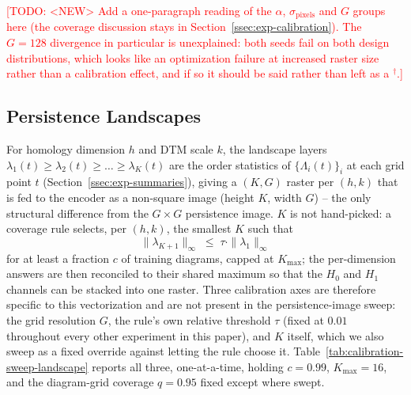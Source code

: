 \documentclass[11pt,letterpaper]{article}
\newcommand{\1}{\mathds{1}}
\newcommand{\todo}[1]{\textcolor{red}{[TODO: #1]}}
\newcommand{\fix}[1]{\textcolor{blue}{[FIX: #1]}}
\newcommand{\todo}[1]{}\newcommand{\fix}[1]{}
\theoremstyle{plain}
\theoremstyle{definitioncolon}
\begin{document}
\todo{<NEW> Add a one-paragraph reading of the $\alpha$, $\sigma_{\text{pixels}}$
and $G$ groups here (the coverage discussion stays in
Section~\ref{ssec:exp-calibration}). The $G=128$ divergence in particular is
unexplained: both seeds fail on both design distributions, which looks like an
optimization failure at increased raster size rather than a calibration effect,
and if so it should be said rather than left as a $^\dagger$.}

\subsection{Persistence Landscapes}
\label{app:calib-landscape}

For homology dimension $h$ and DTM scale $k$, the landscape layers
$\lambda_1(t) \geq \lambda_2(t) \geq \dots \geq \lambda_K(t)$ are the order
statistics of $\{\Lambda_i(t)\}_i$ at each grid point $t$ (Section~\ref{ssec:exp-summaries}),
giving a $(K, G)$ raster per $(h, k)$ that is fed to the encoder as a
non-square image (height $K$, width $G$) -- the only structural difference from
the $G \times G$ persistence image. $K$ is not hand-picked: a coverage rule
selects, per $(h,k)$, the smallest $K$ such that
    \[
    \|\lambda_{K+1}\|_\infty \;\leq\; \tau \cdot \|\lambda_1\|_\infty
    \]
for at least a fraction $c$ of training diagrams, capped at $K_{\max}$; the
per-dimension answers are then reconciled to their shared maximum so that the
$H_0$ and $H_1$ channels can be stacked into one raster. Three calibration axes
are therefore specific to this vectorization and are not present in the
persistence-image sweep: the grid resolution $G$, the rule's own relative
threshold $\tau$ (fixed at $0.01$ throughout every other experiment in this
paper), and $K$ itself, which we also sweep as a fixed override against letting
the rule choose it. Table~\ref{tab:calibration-sweep-landscape} reports all
three, one-at-a-time, holding $c = 0.99$, $K_{\max} = 16$, and the diagram-grid
coverage $q = 0.95$ fixed except where swept.
\end{document}
